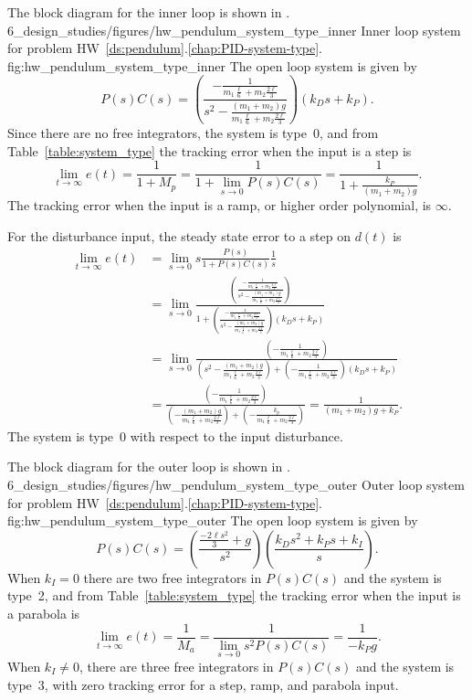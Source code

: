 
The block diagram for the inner loop is shown in .
	{6_design_studies/figures/hw_pendulum_system_type_inner}
	{Inner loop system for problem HW~\ref{ds:pendulum}.\ref{chap:PID-system-type}.}
	{fig:hw_pendulum_system_type_inner}
The open loop system is given by
\[
P(s)C(s) = \left(\frac{-\frac{1}{m_1\frac{\ell}{6}+m_2\frac{2\ell}{3}}}{s^2-\frac{(m_1+m_2)g}{m_1\frac{\ell}{6}+m_2\frac{2\ell}{3}}}\right)\left(k_Ds+k_P\right).
\]
Since there are no free integrators, the system is type~0, and from Table~\ref{table:system_type} the tracking error when the input is a step is \[
\lim_{t\to\infty}e(t) = \frac{1}{1+M_p} = \frac{1}{1+\lim_{s\to 0} P(s)C(s)} = \frac{1}{1+\frac{k_P}{(m_1+m_2)g}}.
\]
The tracking error when the input is a ramp, or higher order polynomial, is $\infty$.

For the disturbance input, the steady state error to a step on $d(t)$ is
\begin{align*}
\lim_{t\to\infty}e(t) &= \lim_{s\to 0}s\frac{P(s)}{1+P(s)C(s)}\frac{1}{s} \\
&= \lim_{s\to 0} \frac{\left(\frac{-\frac{1}{m_1\frac{\ell}{6}+m_2\frac{2\ell}{3}}}{s^2-\frac{(m_1+m_2)g}{m_1\frac{\ell}{6}+m_2\frac{2\ell}{3}}}\right)}{1+\left(\frac{-\frac{1}{m_1\frac{\ell}{6}+m_2\frac{2\ell}{3}}}{s^2-\frac{(m_1+m_2)g}{m_1\frac{\ell}{6}+m_2\frac{2\ell}{3}}}\right)\left(k_Ds+k_P\right)} \\
&= \lim_{s\to 0} \frac{\left(-\frac{1}{m_1\frac{\ell}{6}+m_2\frac{2\ell}{3}}\right)}{\left(s^2-\frac{(m_1+m_2)g}{m_1\frac{\ell}{6}+m_2\frac{2\ell}{3}}\right)+\left(-\frac{1}{m_1\frac{\ell}{6}+m_2\frac{2\ell}{3}}\right)\left(k_Ds+k_P\right)} \\
&=\frac{\left(-\frac{1}{m_1\frac{\ell}{6}+m_2\frac{2\ell}{3}}\right)}{\left(-\frac{(m_1+m_2)g}{m_1\frac{\ell}{6}+m_2\frac{2\ell}{3}}\right)+\left(-\frac{k_p}{m_1\frac{\ell}{6}+m_2\frac{2\ell}{3}}\right)} 
= \frac{1}{(m_1+m_2)g+k_P}.
\end{align*}
The system is type~0 with respect to the input disturbance.

The block diagram for the outer loop is shown in .
	{6_design_studies/figures/hw_pendulum_system_type_outer}
	{Outer loop system for problem HW~\ref{ds:pendulum}.\ref{chap:PID-system-type}.}
	{fig:hw_pendulum_system_type_outer}
The open loop system is given by
\[
P(s)C(s) = \left(\frac{\frac{-2\ell s^2}{3}+g}{s^2}\right)\left(\frac{k_Ds^2+k_Ps+k_I}{s}\right).
\]
When $k_I=0$ there are two free integrators in $P(s)C(s)$ and the system is type~2, and from Table~\ref{table:system_type} the tracking error when the input is a parabola is \[
\lim_{t\to\infty}e(t) = \frac{1}{M_a} = \frac{1}{\lim_{s\to 0} s^2P(s)C(s)} = \frac{1}{-k_Pg}.
\]
When $k_I\neq 0$, there are three free integrators in $P(s)C(s)$ and the system is type~3, with zero tracking error for a step, ramp, and parabola input.


